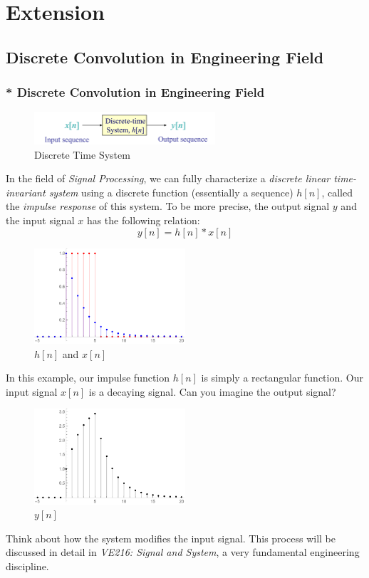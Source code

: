 \documentclass[10pt, t]{beamer}
\renewcommand{\emph}[1]{{\color{themecolor}\textsl{#1}}}
\begin{document}
\section{Extension}
\subsection{Discrete Convolution in Engineering Field}
\begin{frame}[allowframebreaks]
    \frametitle{* Discrete Convolution in Engineering Field}
    \begin{figure}[H]
        \centering
        \includegraphics[width=0.6\textwidth]{2020-11-11-16-50-46.png}
        \caption{Discrete Time System}
    \end{figure}
    
    In the field of \emph{Signal Processing}, we can fully characterize a \emph{ discrete linear time-invariant system} using a discrete function (essentially a sequence) $h[n]$, called the \emph{impulse response} of this system. To be more precise, the output signal $y$ and the input signal $x$ has the following relation:
    $$y[n]=h[n]*x[n]$$
    \begin{figure}[H]
        \centering
        \includegraphics[width=0.5\textwidth]{1.pdf}
        \caption{{\color{red} $h[n]$} and {\color{blue} $x[n]$}}
    \end{figure}
    In this example, our impulse function {\color{red} $h[n]$} is simply a rectangular function. Our input signal {\color{blue} $x[n]$} is a decaying signal. Can you imagine the output signal?

\begin{figure}[H]
    \centering
    \includegraphics[width=0.5\textwidth]{2.pdf}
    \caption{$y[n]$}
\end{figure}

Think about how the system modifies the input signal. This process will be discussed in detail in \emph{VE216: Signal and System}, a very fundamental engineering discipline.
    
\end{frame}
\end{document}
